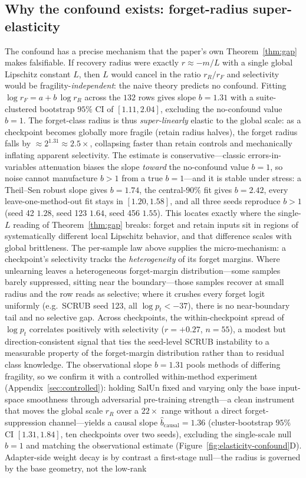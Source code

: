 \documentclass[11pt]{article}
\begin{document}
\subsection{Why the confound exists: forget-radius super-elasticity}
The confound has a precise mechanism that the paper's own Theorem~\ref{thm:gap} makes falsifiable. If recovery radius were exactly $r \approx -m/L$ with a single global Lipschitz constant $L$, then $L$ would cancel in the ratio $r_R/r_F$ and selectivity would be fragility-\emph{independent}: the naive theory predicts no confound. Fitting $\log r_F = a + b\,\log r_R$ across the $132$ rows gives slope $b = 1.31$ with a suite-clustered bootstrap $95\%$ CI of $[1.11, 2.04]$, excluding the no-confound value $b = 1$. The forget-class radius is thus \emph{super-linearly} elastic to the global scale: as a checkpoint becomes globally more fragile (retain radius halves), the forget radius falls by $\approx 2^{1.31}\!\approx\!2.5\times$, collapsing faster than retain controls and mechanically inflating apparent selectivity. The estimate is conservative---classic errors-in-variables attenuation biases the slope \emph{toward} the no-confound value $b=1$, so noise cannot manufacture $b>1$ from a true $b=1$---and it is stable under stress: a Theil--Sen robust slope gives $b=1.74$, the central-$90\%$ fit gives $b=2.42$, every leave-one-method-out fit stays in $[1.20,1.58]$, and all three seeds reproduce $b>1$ (seed 42 $1.28$, seed 123 $1.64$, seed 456 $1.55$). This locates exactly where the single-$L$ reading of Theorem~\ref{thm:gap} breaks: forget and retain inputs sit in regions of systematically different local Lipschitz behavior, and that difference scales with global brittleness. The per-sample law above supplies the micro-mechanism: a checkpoint's selectivity tracks the \emph{heterogeneity} of its forget margins. Where unlearning leaves a heterogeneous forget-margin distribution---some samples barely suppressed, sitting near the boundary---those samples recover at small radius and the row reads as selective; where it crushes every forget logit uniformly (e.g.\ SCRUB seed 123, all $\log p_t < -37$), there is no near-boundary tail and no selective gap. Across checkpoints, the within-checkpoint spread of $\log p_t$ correlates positively with selectivity ($r=+0.27$, $n=55$), a modest but direction-consistent signal that ties the seed-level SCRUB instability to a measurable property of the forget-margin distribution rather than to residual class knowledge. The observational slope $b=1.31$ pools methods of differing fragility, so we confirm it with a controlled within-method experiment (Appendix~\ref{sec:controlled}): holding SalUn fixed and varying only the base input-space smoothness through adversarial pre-training strength---a clean instrument that moves the global scale $r_R$ over a $22\times$ range without a direct forget-suppression channel---yields a causal slope $\hat b_{\text{causal}} = 1.36$ (cluster-bootstrap $95\%$ CI $[1.31,1.84]$, ten checkpoints over two seeds), excluding the single-scale null $b=1$ and matching the observational estimate (Figure~\ref{fig:elasticity-confound}D). Adapter-side weight decay is by contrast a first-stage null---the radius is governed by the base geometry, not the low-rank 
\end{document}

